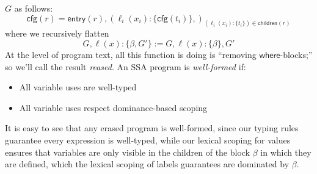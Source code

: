 \documentclass[acmsmall,screen,review]{acmart}
\newcommand{\ms}[1]{\ensuremath{\mathsf{#1}}}
\newcommand{\lto}{:}
\newcommand{\wbranch}[3]{#1(#2) \lto \{#3\}}
\newcommand{\toentry}[1]{\ms{entry}(#1)}
\newcommand{\todom}[1]{\ms{children}(#1)}
\newcommand{\tocfg}[1]{\ms{cfg}(#1)}
\begin{document}
$G$ as follows:
\begin{equation}
    \tocfg{r} = \toentry{r}, (\wbranch{\ell_i}{x_i}{\tocfg{t_i}},)_{
      (\wbranch{\ell_i}{x_i}{t_i}) \in \todom{r}}
\end{equation}
where we recursively flatten
\begin{equation}
  G, \wbranch{\ell}{x}{\beta, G'} := G, \wbranch{\ell}{x}{\beta}, G' 
\end{equation}
At the level of program text, all this function is doing is ``removing \ms{where}-blocks;'' so we'll
call the result \emph{reased}. An SSA program is \emph{well-formed} if:
\begin{itemize}
  \item All variable uses are well-typed
  \item All variable uses respect dominance-based scoping
\end{itemize}
It is easy to see that any erased program is well-formed, since our typing rules guarantee every
expression is well-typed, while our lexical scoping for values ensures that variables are only
visible in the children of the block $\beta$ in which they are defined, which the lexical scoping of
labels guarantees are dominated by $\beta$. 
\end{document}
